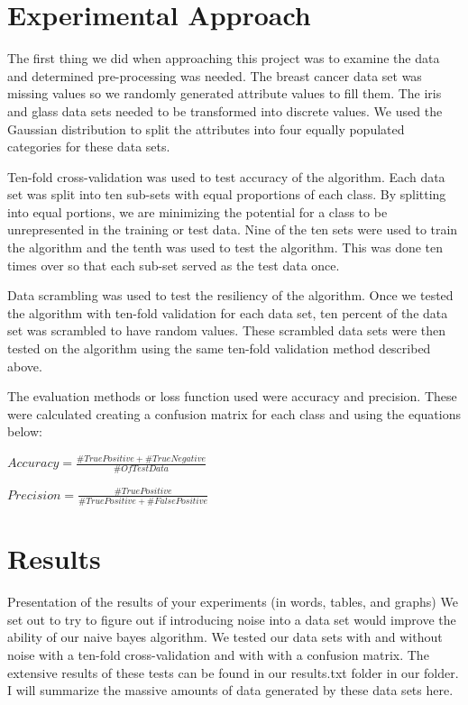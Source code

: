 \documentclass[twoside,11pt]{article}
\begin{document}
\section{Experimental Approach}

The first thing we did when approaching this project was to examine the data and determined pre-processing was needed. The breast cancer data set was missing values so we randomly generated attribute values to fill them. The iris and glass data sets needed to be transformed into discrete values. We used the Gaussian distribution to split the attributes into four equally populated categories for these data sets.

Ten-fold cross-validation was used to test accuracy of the algorithm.  Each data set was split into ten sub-sets with equal proportions of each class. By splitting into equal portions, we are minimizing the potential for a class to be unrepresented in the training or test data. Nine of the ten sets were used to train the algorithm and the tenth was used to test the algorithm. This was done ten times over so that each sub-set served as the test data once. 

Data scrambling was used to test the resiliency of the algorithm. Once we tested the algorithm with ten-fold validation for each data set, ten percent of the data set was scrambled to have random values. These scrambled data sets were then tested on the algorithm using the same ten-fold validation method described above.   

The evaluation methods or loss function used were accuracy and precision. These were calculated creating a confusion matrix for each class and using the equations below:
\begin{center}
    $Accuracy = \frac{\#TruePositive + \#TrueNegative}{\# Of TestData}$\\
\end{center}

\begin{center}
    $Precision = \frac{\#TruePositive}{\#TruePositive + \#FalsePositive}$\\
\end{center}

\section{Results}

Presentation of the results of your experiments (in words, tables, and graphs)
We set out to try to figure out if introducing noise into a data set would improve the ability of our naive bayes algorithm. We tested our data sets with and without noise with a ten-fold cross-validation and with with a confusion matrix. The extensive results of these tests can be found in our results.txt folder in our folder. I will summarize the massive amounts of data generated by these data sets here.
\end{document}
